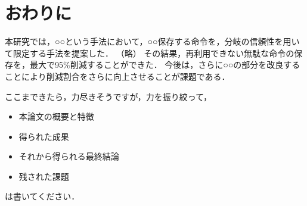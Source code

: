 \chapter{おわりに}
本研究では，○○という手法において，○○保存する命令を，分岐の信頼性を用いて限定する手法を提案した．
（略）
その結果，再利用できない無駄な命令の保存を，最大で95\%削減することができた．
今後は，さらに○○の部分を改良することにより削減割合をさらに向上させることが課題である．

ここまできたら，力尽きそうですが，力を振り絞って，
\begin{itemize}
\item 本論文の概要と特徴
\item 得られた成果
\item それから得られる最終結論
\item 残された課題
\end{itemize}
は書いてください．
